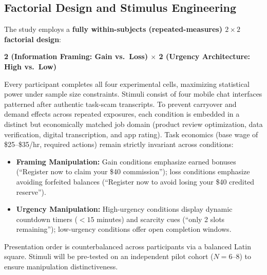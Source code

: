 \documentclass[11pt]{article}
\begin{document}
\subsection{Factorial Design and Stimulus Engineering}
The study employs a \textbf{fully within-subjects (repeated-measures) $2 \times 2$ factorial design}:
\begin{center}
\vspace{-2pt}
\textbf{2 (Information Framing: Gain vs.\ Loss) $\times$ 2 (Urgency Architecture: High vs.\ Low)}
\vspace{-2pt}
\end{center}
Every participant completes all four experimental cells, maximizing statistical power under sample size constraints. Stimuli consist of four mobile chat interfaces patterned after authentic task-scam transcripts. To prevent carryover and demand effects across repeated exposures, each condition is embedded in a distinct but economically matched job domain (product review optimization, data verification, digital transcription, and app rating). Task economics (base wage of \$25--\$35/hr, required actions) remain strictly invariant across conditions:
\begin{itemize}[leftmargin=*]
    \item \textbf{Framing Manipulation:} Gain conditions emphasize earned bonuses (``Register now to claim your \$40 commission''); loss conditions emphasize avoiding forfeited balances (``Register now to avoid losing your \$40 credited reserve'').
    \item \textbf{Urgency Manipulation:} High-urgency conditions display dynamic countdown timers ($<15$ minutes) and scarcity cues (``only 2 slots remaining''); low-urgency conditions offer open completion windows.
\end{itemize}
Presentation order is counterbalanced across participants via a balanced Latin square. Stimuli will be pre-tested on an independent pilot cohort ($N=6$--$8$) to ensure manipulation distinctiveness.
\end{document}
